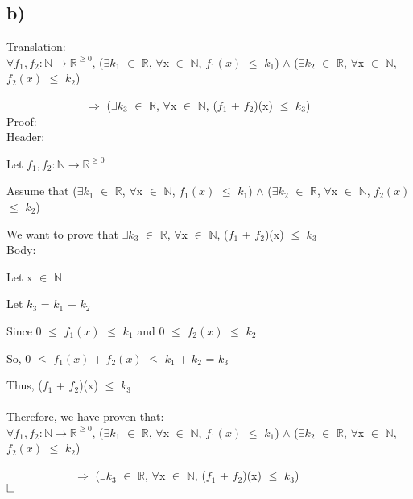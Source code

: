 \documentclass[12pt]{article}
\begin{document}
\vspace{20pt}
\subsection*{b)}
Translation:\\
\(\forall f_1, f_2 : \mathbb{N} \to \mathbb{R}^{\geq 0}\), ($\exists$$k_1$ $\in$ $\mathbb{R}$, $\forall$x $\in$ $\mathbb{N}$, $f_1(x)$ $\leq$ $k_1$) $\wedge$ ($\exists$$k_2$ $\in$ $\mathbb{R}$, $\forall$x $\in$ $\mathbb{N}$, $f_2(x)$ $\leq$ $k_2$)

$\qquad$ $\qquad$ $\qquad$ $\Rightarrow$ ($\exists$$k_3$ $\in$ $\mathbb{R}$, $\forall$x $\in$ $\mathbb{N}$, ($f_1$ + $f_2$)(x) $\leq$ $k_3$) \\
Proof:\\
Header:

Let \(f_1, f_2 : \mathbb{N} \to \mathbb{R}^{\geq 0}\) 

Assume that ($\exists$$k_1$ $\in$ $\mathbb{R}$, $\forall$x $\in$ $\mathbb{N}$, $f_1(x)$ $\leq$ $k_1$) $\wedge$ ($\exists$$k_2$ $\in$ $\mathbb{R}$, $\forall$x $\in$ $\mathbb{N}$, $f_2(x)$ $\leq$ $k_2$)

We want to prove that $\exists$$k_3$ $\in$ $\mathbb{R}$, $\forall$x $\in$ $\mathbb{N}$, ($f_1$ + $f_2$)(x) $\leq$ $k_3$  \\
Body:

Let x $\in$ $\mathbb{N}$

Let $k_3$ = $k_1$ + $k_2$

Since 0 $\leq$ $f_1(x)$ $\leq$ $k_1$ and 0 $\leq$ $f_2(x)$ $\leq$ $k_2$

So, 0 $\leq$ $f_1(x)$ + $f_2(x)$ $\leq$ $k_1$ + $k_2$ = $k_3$

Thus, ($f_1$ + $f_2$)(x) $\leq$ $k_3$ \\
~\\
Therefore, we have proven that: \\
\(\forall f_1, f_2 : \mathbb{N} \to \mathbb{R}^{\geq 0}\), ($\exists$$k_1$ $\in$ $\mathbb{R}$, $\forall$x $\in$ $\mathbb{N}$, $f_1(x)$ $\leq$ $k_1$) $\wedge$ ($\exists$$k_2$ $\in$ $\mathbb{R}$, $\forall$x $\in$ $\mathbb{N}$, $f_2(x)$ $\leq$ $k_2$)

$\qquad$ $\qquad$ $\quad$ $\Rightarrow$ ($\exists$$k_3$ $\in$ $\mathbb{R}$, $\forall$x $\in$ $\mathbb{N}$, ($f_1$ + $f_2$)(x) $\leq$ $k_3$) \\

$\hfill\square$

\newpage

\vspace{20pt}
\end{document}
